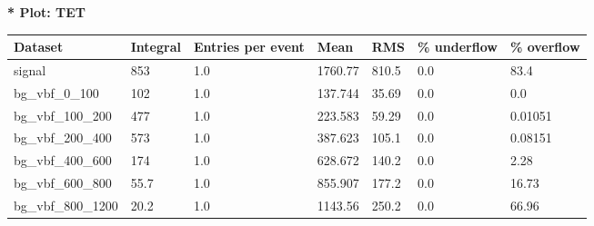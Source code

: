 \documentclass[a4paper, 10pt]{article}
\begin{document}
\textbf{* Plot: TET}\\
   \begin{table}[H]
  \begin{center}
    \begin{tabular}{|m{23.0mm}|m{23.0mm}|m{18.0mm}|m{19.0mm}|m{19.0mm}|m{19.0mm}|m{19.0mm}|}
      \hline
      {\cellcolor{yellow}         Dataset}& {\cellcolor{yellow}         Integral}& {\cellcolor{yellow}         Entries per event}& {\cellcolor{yellow}         Mean}& {\cellcolor{yellow}         RMS}& {\cellcolor{yellow}         \% underflow}& {\cellcolor{yellow}         \% overflow}\\
      \hline
      {\cellcolor{white}         signal}& {\cellcolor{white}         853}& {\cellcolor{white}         1.0}& {\cellcolor{white}         1760.77}& {\cellcolor{white}         810.5}& {\cellcolor{red}         0.0}& {\cellcolor{red}         83.4}\\
      \hline
      {\cellcolor{white}         bg\_vbf\_0\_100}& {\cellcolor{white}         102}& {\cellcolor{white}         1.0}& {\cellcolor{white}         137.744}& {\cellcolor{white}         35.69}& {\cellcolor{green}         0.0}& {\cellcolor{green}         0.0}\\
      \hline
      {\cellcolor{white}         bg\_vbf\_100\_200}& {\cellcolor{white}         477}& {\cellcolor{white}         1.0}& {\cellcolor{white}         223.583}& {\cellcolor{white}         59.29}& {\cellcolor{green}         0.0}& {\cellcolor{green}         0.01051}\\
      \hline
      {\cellcolor{white}         bg\_vbf\_200\_400}& {\cellcolor{white}         573}& {\cellcolor{white}         1.0}& {\cellcolor{white}         387.623}& {\cellcolor{white}         105.1}& {\cellcolor{green}         0.0}& {\cellcolor{green}         0.08151}\\
      \hline
      {\cellcolor{white}         bg\_vbf\_400\_600}& {\cellcolor{white}         174}& {\cellcolor{white}         1.0}& {\cellcolor{white}         628.672}& {\cellcolor{white}         140.2}& {\cellcolor{green}         0.0}& {\cellcolor{green}         2.28}\\
      \hline
      {\cellcolor{white}         bg\_vbf\_600\_800}& {\cellcolor{white}         55.7}& {\cellcolor{white}         1.0}& {\cellcolor{white}         855.907}& {\cellcolor{white}         177.2}& {\cellcolor{red}         0.0}& {\cellcolor{red}         16.73}\\
      \hline
      {\cellcolor{white}         bg\_vbf\_800\_1200}& {\cellcolor{white}         20.2}& {\cellcolor{white}         1.0}& {\cellcolor{white}         1143.56}& {\cellcolor{white}         250.2}& {\cellcolor{red}         0.0}& {\cellcolor{red}         66.96}\\

\end{tabular}
\end{center}
\end{table}
\end{document}
